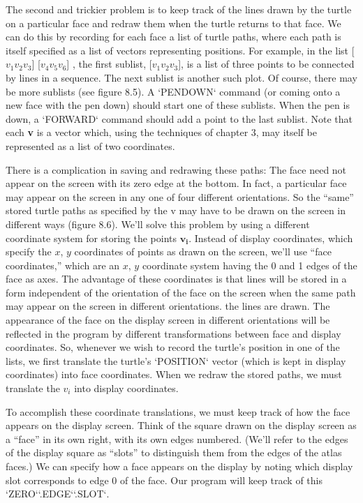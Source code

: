 \documentclass{book}
\begin{document}
The second and trickier problem is to keep track of the lines drawn by
the turtle on a particular face and redraw them when the turtle returns
to that face. We can do this by recording for each face a list of turtle
paths, where each path is itself specified as a list of vectors representing
positions. For example, in the list [$v_1 v_2 v_3$] [$v_4 v_5 v_6$] , the first
sublist, [$v_1 v_2 v_3$], is a list of three points to be connected by lines
in a sequence. The next sublist is another such plot. Of course, there
may be more sublists (see figure 8.5). A \textsc{`PENDOWN`} command (or coming
onto a new face with the pen down) should start one of these sublists.
When the pen is down, a \textsc{`FORWARD`} command should add a point to the
last sublist. Note that each \textbf{v} is a vector which, using the techniques of
chapter 3, may itself be represented as a list of two coordinates.

   There is a complication in saving and redrawing these paths: The face
need not appear on the screen with its zero edge at the bottom. In fact,
a particular face may appear on the screen in any one of four different
orientations. So the ``same'' stored turtle paths as specified by the v may
have to be drawn on the screen in different ways (figure 8.6). We'll solve
this problem by using a different coordinate system for storing the points
$\mathbf{v_i}$. Instead of display coordinates, which specify the $x$, $y$ coordinates
of points as drawn on the screen, we'll use ``face coordinates,'' which
are an $x$, $y$ coordinate system having the 0 and 1 edges of the face as
axes. The advantage of these coordinates is that lines will be stored in
a form independent of the orientation of the face on the screen when
the same path may appear on the screen in different orientations.
the lines are drawn. The appearance of the face on the display screen
in different orientations will be reflected in the program by different
transformations between face and display coordinates. So, whenever we
wish to record the turtle's position in one of the lists, we first translate
the turtle's \textsc{`POSITION`} vector (which is kept in display coordinates) into
face coordinates. When we redraw the stored paths, we must translate
the $v_i$ into display coordinates.

To accomplish these coordinate translations, we must keep track of
how the face appears on the display screen. Think of the square drawn
on the display screen as a ``face'' in its own right, with its own edges
numbered. (We'll refer to the edges of the display square as ``slots'' to
distinguish them from the edges of the atlas faces.) We can specify how
a face appears on the display by noting which display slot corresponds to
edge 0 of the face. Our program will keep track of this \textsc{`ZERO`}\textsc{`.EDGE`}\textsc{`.SLOT`}.
\end{document}
